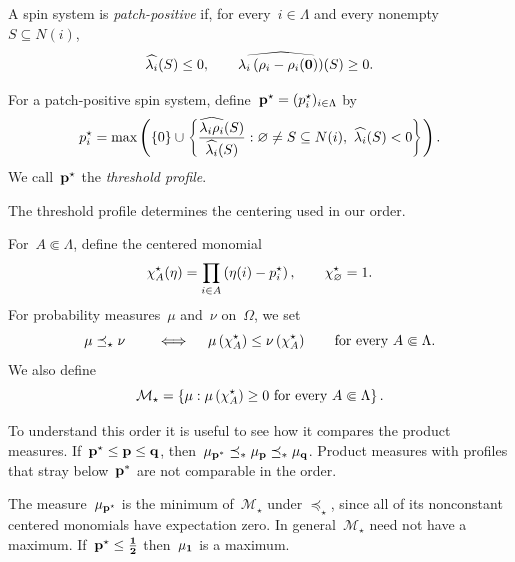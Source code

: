 \documentclass[EJP,preprint,NODS,nobera]{ejpecp}
\begin{document}
\begin{definition}
A spin system is \emph{patch-positive} if, for every~$i\in\Lambda$ and every
nonempty~$S\subseteq N(i)$,
\begin{equation}
\label{eq:patch-positivity}
\widehat{\lambda_i}(S)\leq0,
\qquad
\widehat{\lambda_i\left(\rho_i-\rho_i(\mathbf{0})\right)}(S)\geq0.
\end{equation}
\end{definition}

\begin{definition}
For a patch-positive spin system, define~$\mathbf{p}^\star=(p_i^\star)_{i\in\Lambda}$ by
\begin{equation}
\label{eq:threshold-profile}
p_i^\star
=
\max\bb{
\cb{0}
\cup
\cb{
\frac{\widehat{\lambda_i\rho_i}(S)}
{\widehat{\lambda_i}(S)}
:
\vn\neq S\subseteq N(i),\ 
\widehat{\lambda_i}(S)<0
}
}.
\end{equation}
We call~$\mathbf{p}^\star$ the \emph{threshold profile}.
\end{definition}
The threshold profile determines the centering used in our order.

\begin{definition}
For~$A\Subset\Lambda$, define the centered monomial
\begin{equation*}
\chi_A^\star(\eta)
=
\prod_{i\in A}\left(\eta(i)-p_i^\star\right),
\qquad
\chi_\varnothing^\star=1.
\end{equation*}
For probability measures~$\mu$ and~$\nu$ on~$\Omega$, we set
\begin{equation}
\label{eq:centered-monomial-order}
\mu\preceq_\star\nu \qquad \iff \quad \mu\left(\chi_A^\star\right)
\leq
\nu\left(\chi_A^\star\right)
\qquad
\text{for every }A\Subset\Lambda.
\end{equation}
We also define
\begin{equation}
\label{eq:m-star-definition-revision}
\mathcal M_\star
=
\left\{
\mu:
\mu\left(\chi_A^\star\right)\geq0
\text{ for every }A\Subset\Lambda
\right\}.
\end{equation}
\end{definition}

To understand this order it is useful to see how it compares the product measures. If~$\mathbf{p}^\star\leq\mathbf{p}\leq\mathbf{q}$, then~$\mu_{\mathbf{p}^*}\preceq_* \mu_{\mathbf{p}}\preceq_* \mu_{\mathbf{q}}$. Product measures with profiles that stray below~$\mathbf{p}^*$ are not comparable in the order.


\begin{remark}
The measure~$\mu_{\mathbf{p}^\star}$ is the minimum of~$\mathcal M_\star$ under
$\preceq_\star$, since all of its nonconstant centered monomials have
expectation zero. In general~$\mathcal M_\star$ need not have a maximum. If~$\mathbf{p}^\star\leq\boldsymbol{\tfrac12}$ then~$\mu_{\mathbf{1}}$ is a maximum.
\end{remark}
\end{document}
